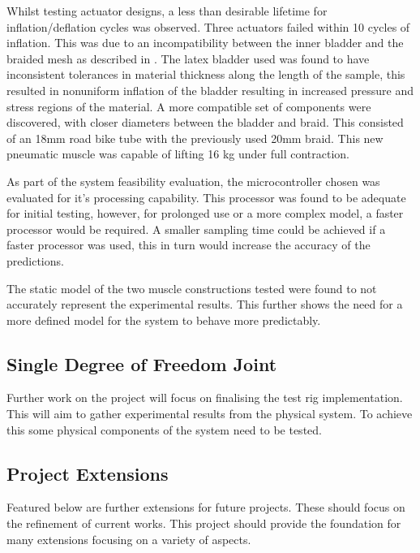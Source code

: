 \documentclass[11pt,a4paper]{article}
\begin{document}
Whilst testing actuator designs, a less than desirable lifetime for inflation/deflation cycles was observed. Three actuators failed within 10 cycles of inflation. This was due to an incompatibility between the inner bladder and the braided mesh as described in \cite{andrikopoulos_nikolakopoulos_2017}. The latex bladder used was found to have inconsistent tolerances in material thickness along the length of the sample, this resulted in nonuniform inflation of the bladder resulting in increased pressure and stress regions of the material. A more compatible set of components were discovered, with closer diameters between the bladder and braid. This consisted of an 18mm road bike tube with the previously used 20mm braid. This new pneumatic muscle was capable of lifting 16 kg under full contraction.\newline

As part of the system feasibility evaluation, the microcontroller chosen was evaluated for it's processing capability. This processor was found to be adequate for initial testing, however, for prolonged use or a more complex model, a faster processor would be required.
A smaller sampling time could be achieved if a faster processor was used, this in turn would increase the accuracy of the predictions.\newline

The static model of the two muscle constructions tested were found to not accurately represent the experimental results. This further shows the need for a more defined model for the system to behave more predictably.

\subsection{Single Degree of Freedom Joint}
\label{sub:two_dof_joint}
Further work on the project will focus on finalising the test rig implementation. This will aim to gather experimental results from the physical system. To achieve this some physical components of the system need to be tested.

\subsection{Project Extensions}
\label{sub:project_extensions}
Featured below are further extensions for future projects. These should focus on the refinement of current works. This project should provide the foundation for many extensions focusing on a variety of aspects.
\end{document}
